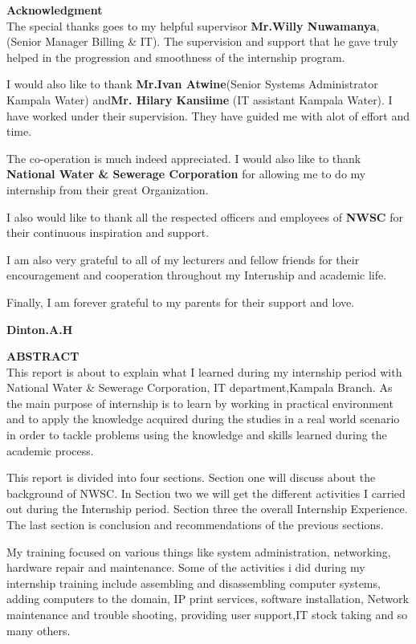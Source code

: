 \documentclass{article}
\begin{document}
\newpage

\textbf{Acknowledgment}\\
The special thanks goes to my helpful supervisor \textbf{Mr.Willy Nuwamanya},(Senior Manager Billing \& IT). The supervision and support that he gave truly helped in the progression and smoothness of the internship program.
\par I would also like to thank \textbf{Mr.Ivan Atwine}(Senior Systems Administrator Kampala Water) and\textbf{Mr. Hilary Kansiime} (IT assistant Kampala Water). I have worked under their supervision. They have guided me with alot of effort and time.
\par The co-operation is much indeed appreciated. I would also like to thank \textbf{National Water \& Sewerage Corporation} for allowing me to do my internship from their great Organization.
\par I also would like to thank all the respected officers and employees of \textbf{NWSC} for their continuous inspiration and support.
\par I am also very grateful to all of my lecturers and fellow friends for their encouragement and cooperation throughout my Internship and academic life.
\par Finally, I am forever grateful to my parents for their support and love.
\begin{flushright}
\textbf{Dinton.A.H}
\end{flushright}
\thispagestyle{empty}
\newpage
\textbf{ABSTRACT}\\
This report is about to explain what I learned during my internship period with National Water \& Sewerage Corporation, IT department,Kampala Branch. As the main purpose of internship is to learn by working in practical environment and to apply the knowledge acquired during the studies in a real world scenario in order to tackle problems using the knowledge and skills learned during the academic process.
\par This report is divided into four  sections. Section one will discuss about the background of NWSC. In Section two we will get the different activities I carried out during the Internship period. Section three the overall Internship Experience. The last section is conclusion and recommendations of the previous sections.
\par My training focused on various things like system administration, networking, hardware repair and maintenance. Some of the activities i did during my internship training include assembling and disassembling computer systems, adding computers to the domain, IP print services, software installation, Network maintenance and trouble shooting, providing user support,IT stock taking  and so many others.
\end{document}
